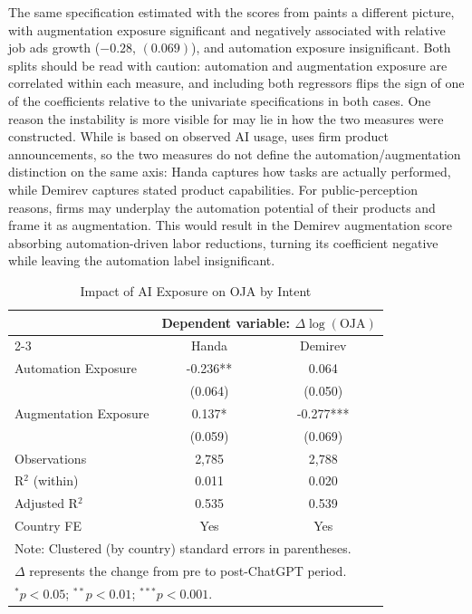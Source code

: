 \documentclass[11pt]{article}
\begin{document}
The same specification estimated with the scores from \citet{demirev2024assessing} paints a different picture, with augmentation exposure significant and negatively associated with relative job ads growth ($-0.28$, $(0.069)$), and automation exposure insignificant. Both splits should be read with caution: automation and augmentation exposure are correlated within each measure, and including both regressors flips the sign of one of the coefficients relative to the univariate specifications in both cases. One reason the instability is more visible for \citet{demirev2024assessing} may lie in how the two measures were constructed. While \citet{handa2025economic} is based on observed AI usage, \citet{demirev2024assessing} uses firm product announcements, so the two measures do not define the automation/augmentation distinction on the same axis: Handa captures how tasks are actually performed, while Demirev captures stated product capabilities. For public-perception reasons, firms may underplay the automation potential of their products and frame it as augmentation. This would result in the Demirev augmentation score absorbing automation-driven labor reductions, turning its coefficient negative while leaving the automation label insignificant.

\begin{table}[htbp]
\centering
\caption{Impact of AI Exposure on OJA by Intent}
\begin{tabular}{lcc}
\hline\hline
 & \multicolumn{2}{c}{Dependent variable: $\Delta \log(\text{OJA})$} \\
\cmidrule(lr){2-3}
 & Handa & Demirev \\
\midrule
Automation Exposure & -0.236** & 0.064 \\
 & (0.064) & (0.050) \\
Augmentation Exposure & 0.137* & -0.277*** \\
 & (0.059) & (0.069) \\
\midrule
Observations & 2,785 & 2,788 \\
R$^2$ (within) & 0.011 & 0.020 \\
Adjusted R$^2$ & 0.535 & 0.539 \\
Country FE & Yes & Yes \\
\hline\hline
\multicolumn{3}{l}{\footnotesize Note: Clustered (by country) standard errors in parentheses.} \\
\multicolumn{3}{l}{\footnotesize $\Delta$ represents the change from pre to post-ChatGPT period.} \\
\multicolumn{3}{l}{\footnotesize $^{*}p<0.05$; $^{**}p<0.01$; $^{***}p<0.001$.} \\
\end{tabular}
\label{table:intent_models}
\end{table}
\end{document}
